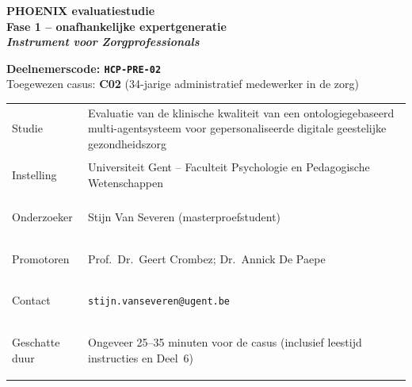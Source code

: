 \documentclass[11pt,a4paper]{article}
\renewcommand{\arraystretch}{1.28}
\begin{document}
\thispagestyle{fancy}
\vspace*{0.3cm}

\begin{tcolorbox}[
  colback=DarkBlue,colframe=DarkBlue,
  arc=3mm,left=14pt,right=14pt,top=12pt,bottom=12pt,
  width=\textwidth
]
\centering
{\fontsize{22}{28}\selectfont\bfseries\color{white}
PHOENIX evaluatiestudie\\[0.3em]
\fontsize{15}{20}\selectfont\color{AccentBlue}
Fase 1 -- onafhankelijke expertgeneratie\\[0.2em]
\fontsize{12}{16}\selectfont\color{white}
\textit{Instrument voor Zorgprofessionals}
}
\end{tcolorbox}

\vspace{0.6cm}

\begin{center}
\begin{tcolorbox}[
  colback=AccentBlue,colframe=PrimaryBlue,
  arc=2.5mm,boxrule=1.2pt,left=12pt,right=12pt,top=10pt,bottom=10pt,
  width=0.86\textwidth
]
\centering
{\large\bfseries\color{DarkBlue}Deelnemerscode: \texttt{HCP-PRE-02}}\\[0.5em]
{\normalsize\color{SlateMid}
Toegewezen casus:\quad
\textbf{\color{PrimaryBlue}C02} (34-jarige administratief medewerker in de zorg)
}
\end{tcolorbox}
\end{center}

\vspace{0.5cm}

\begin{center}
\begin{tcolorbox}[
  colback=SoftBG,colframe=BorderGrey,
  arc=2mm,left=10pt,right=10pt,top=9pt,bottom=9pt,
  width=0.92\textwidth
]
\small\renewcommand{\arraystretch}{1.28}
\begin{tabularx}{\textwidth}{@{}>{\bfseries\raggedright\arraybackslash}p{}X@{}}
Studie & Evaluatie van de klinische kwaliteit van een ontologiegebaseerd multi-agentsysteem voor gepersonaliseerde digitale geestelijke gezondheidszorg \\
Instelling & Universiteit Gent -- Faculteit Psychologie en Pedagogische Wetenschappen \\
Onderzoeker & Stijn Van Severen (masterproefstudent) \\
Promotoren & Prof.\ Dr.\ Geert Crombez; Dr.\ Annick De Paepe \\
Contact & \texttt{stijn.vanseveren@ugent.be} \\
Geschatte duur & Ongeveer 25--35 minuten voor de casus (inclusief leestijd instructies en Deel~6) \\
\end{tabularx}
\end{tcolorbox}
\end{center}
\end{document}
